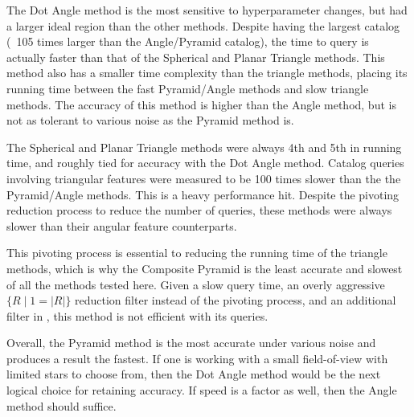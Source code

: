 The Dot Angle method is the most sensitive to hyperparameter changes, but had a larger ideal region than the other
methods.
Despite having the largest catalog (~105 times larger than the Angle/Pyramid catalog), the time to query is actually
faster than that of the Spherical and Planar Triangle methods.
This method also has a smaller time complexity than the triangle methods, placing its running time between the fast
Pyramid/Angle methods and slow triangle methods.
The accuracy of this method is higher than the Angle method, but is not as tolerant to various noise as the Pyramid
method is.

The Spherical and Planar Triangle methods were always 4th and 5th in running time, and roughly tied for accuracy
with the Dot Angle method.
Catalog queries involving triangular features were measured to be 100 times slower than the the Pyramid/Angle methods.
This is a heavy performance hit.
Despite the pivoting reduction process to reduce the number of queries, these methods were always slower than
their angular feature counterparts.

This pivoting process is essential to reducing the running time of the triangle methods, which is why the Composite
Pyramid is the least accurate and slowest of all the methods tested here.
Given a slow query time, an overly aggressive $\{ R \mid 1 = |R| \}$ reduction filter instead of the pivoting process,
and an additional filter in , this method is not efficient with its queries.

Overall, the Pyramid method is the most accurate under various noise and produces a result the fastest.
If one is working with a small field-of-view with limited stars to choose from, then the Dot Angle method would be
the next logical choice for retaining accuracy.
If speed is a factor as well, then the Angle method should suffice.